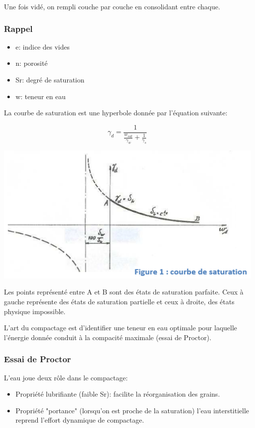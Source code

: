 Une fois vidé, on rempli couche par couche en consolidant entre chaque.

\subsubsection{Rappel}

\begin{itemize}
    \item e: indice des vides
    \item n: porosité
    \item Sr: degré de saturation
    \item w: teneur en eau
\end{itemize} 

\medskip

La courbe de saturation est une hyperbole donnée par l'équation suivante:

$$ \gamma_d = \frac{1}{\frac{w_{sat}}{\gamma_w}+\frac{1}{\gamma_s}}$$

\begin{center}
\includegraphics [scale=0.5]{pictures/cs.PNG}
\end{center}

Les points représenté entre A et B sont des états de saturation parfaite. Ceux à gauche représente des états de saturation partielle et ceux à droite, des états physique impossible.

L'art du compactage est d'identifier une teneur en eau optimale pour laquelle l'énergie donnée conduit à la compacité maximale (essai de Proctor).

\subsubsection{Essai de Proctor}

L'eau joue deux rôle dans le compactage:
\begin{itemize}
    \item Propriété lubrifiante (faible Sr): facilite la réorganisation des grains.
    \item Propriété "portance" (lorsqu'on est proche de la saturation) l'eau interstitielle reprend l'effort dynamique de compactage.
\end{itemize} 


